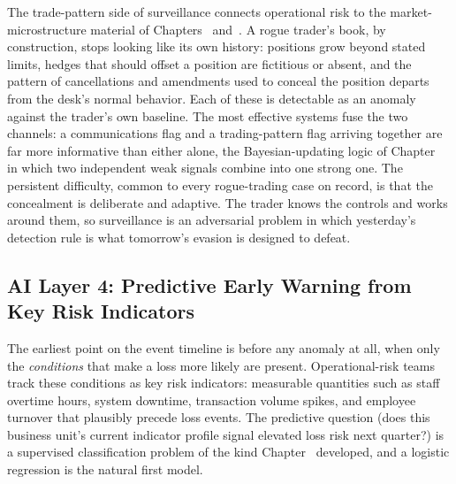 \documentclass[../ai_in_finance]{subfiles}
\begin{document}
The trade-pattern side of surveillance connects operational risk to the market-microstructure material of Chapters~ and~. A rogue trader's book, by construction, stops looking like its own history: positions grow beyond stated limits, hedges that should offset a position are fictitious or absent, and the pattern of cancellations and amendments used to conceal the position departs from the desk's normal behavior. Each of these is detectable as an anomaly against the trader's own baseline. The most effective systems fuse the two channels: a communications flag and a trading-pattern flag arriving together are far more informative than either alone, the Bayesian-updating logic of Chapter~ in which two independent weak signals combine into one strong one. The persistent difficulty, common to every rogue-trading case on record, is that the concealment is deliberate and adaptive. The trader knows the controls and works around them, so surveillance is an adversarial problem in which yesterday's detection rule is what tomorrow's evasion is designed to defeat.

\subsection{AI Layer 4: Predictive Early Warning from Key Risk Indicators}
\label{sec:oprisk-kri}

The earliest point on the event timeline is before any anomaly at all, when only the \emph{conditions} that make a loss more likely are present. Operational-risk teams track these conditions as key risk indicators: measurable quantities such as staff overtime hours, system downtime, transaction volume spikes, and employee turnover that plausibly precede loss events. The predictive question (does this business unit's current indicator profile signal elevated loss risk next quarter?) is a supervised classification problem of the kind Chapter~ developed, and a logistic regression is the natural first model.
\end{document}
